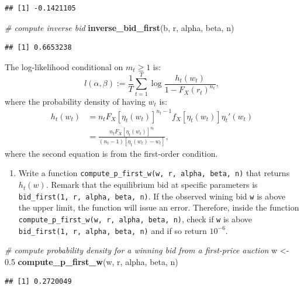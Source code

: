 \documentclass[]{book}
\newenvironment{Shaded}{\begin{snugshade}}{\end{snugshade}}
\newcommand{\KeywordTok}[1]{\textcolor[rgb]{0.13,0.29,0.53}{\textbf{#1}}}
\newcommand{\FloatTok}[1]{\textcolor[rgb]{0.00,0.00,0.81}{#1}}
\newcommand{\StringTok}[1]{\textcolor[rgb]{0.31,0.60,0.02}{#1}}
\newcommand{\CommentTok}[1]{\textcolor[rgb]{0.56,0.35,0.01}{\textit{#1}}}
\newcommand{\NormalTok}[1]{#1}
\providecommand{\tightlist}{%
  \setlength{\itemsep}{0pt}\setlength{\parskip}{0pt}}
\begin{document}
\begin{verbatim}
## [1] -0.1421105
\end{verbatim}

\begin{Shaded}
\begin{Highlighting}[]
\CommentTok{# compute inverse bid}
\KeywordTok{inverse_bid_first}\NormalTok{(b, r, alpha, beta, n)}
\end{Highlighting}
\end{Shaded}

\begin{verbatim}
## [1] 0.6653238
\end{verbatim}

The log-likelihood conditional on \(m_t \ge 1\) is: \[
l(\alpha, \beta) := \frac{1}{T}\sum_{t = 1}^T \log \frac{h_t(w_t)}{1 - F_X(r_t)^{n_t}},
\] where the probability density of having \(w_t\) is: \[
\begin{split}
h_t(w_t) &= n_t F_X[\eta_t(w_t)]^{n_t - 1} f_X[\eta_t(w_t)] \eta_t'(w_t)\\
&= \frac{n_t F_X[\eta_t(w_t)]^{n_t}}{(n_t - 1)[\eta_t(w_t) - w_t]},
\end{split}
\] where the second equation is from the first-order condition.

\begin{enumerate}
\def\labelenumi{\arabic{enumi}.}
\setcounter{enumi}{5}
\tightlist
\item
  Write a function
  \texttt{compute\_p\_first\_w(w,\ r,\ alpha,\ beta,\ n)} that returns
  \(h_t(w)\). Remark that the equilibrium bid at specific parameters is
  \texttt{bid\_first(1,\ r,\ alpha,\ beta,\ n)}. If the observed wining
  bid \texttt{w} is above the upper limit, the function will issue an
  error. Therefore, inside the function
  \texttt{compute\_p\_first\_w(w,\ r,\ alpha,\ beta,\ n)}, check if
  \texttt{w} is above \texttt{bid\_first(1,\ r,\ alpha,\ beta,\ n)} and
  if so return \(10^{-6}\).
\end{enumerate}

\begin{Shaded}
\begin{Highlighting}[]
\CommentTok{# compute probability density for a winning bid from a first-price auction}
\NormalTok{w <-}\StringTok{ }\FloatTok{0.5}
\KeywordTok{compute_p_first_w}\NormalTok{(w, r, alpha, beta, n)}
\end{Highlighting}
\end{Shaded}

\begin{verbatim}
## [1] 0.2720049
\end{verbatim}
\end{document}

